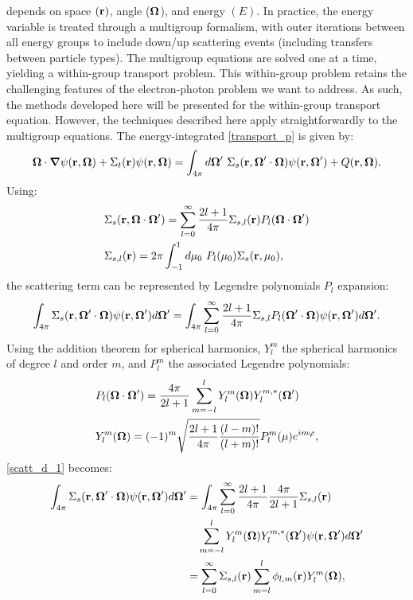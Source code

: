  depends on space $(\mathbf{r})$, angle ($\boldsymbol{\Omega}$), and 
energy $(E)$. In practice, the energy variable is treated through a
multigroup formalism, with outer iterations between all energy groups to
include down/up scattering events (including transfers between particle
types). The multigroup equations are solved one at a time, yielding a
within-group transport problem. This within-group problem retains the 
challenging features of the electron-photon problem we want to address. 
As such, the methods developed here will be presented for the within-group 
transport equation. However, the techniques described here apply 
straightforwardly to the multigroup equations. The energy-integrated 
\cref{transport_p} is given by:
\begin{equation}
\bo\cdot \bn \psi(\br,\bo) + \Sigma_t(\br)\psi(\br,\bo) =
\int_{4\pi}d\bo'\ \Sigma_s(\br,\bo'\cdot\bo)\psi(\br,\bo')+Q(\br,\bo).
\label{transport_p2}
\end{equation}
%
Using:
\begin{align}
  &\Sigma_s(\mathbf{r},\boldsymbol{\Omega}\cdot\boldsymbol{\Omega}') = \sum_{l=0}^{\infty} \frac{2l+1}{4\pi}
  \Sigma_{s,l}(\mathbf{r}) P_l(\boldsymbol{\Omega}\cdot\boldsymbol{\Omega}')\\
  &\Sigma_{s,l}(\mathbf{r}) = 2\pi \int_{-1}^1 d\mu_0\ P_l(\mu_0)
  \Sigma_s(\mathbf{r},\mu_0),
\end{align}
the scattering term can be represented by Legendre polynomials $P_l$ expansion:
\begin{equation}
  \int_{4\pi} \Sigma_s(\br,\bo'\cdot\bo) \psi(\br,\bo') d\bo' =
  \int_{4\pi} \sum_{l=0}^{\infty} \frac{2l+1}{4\pi} \Sigma_{s,l} P_l(\bo'\cdot\bo)
  \psi(\br,\bo') d\bo'.
  \label{scatt_d_1}
\end{equation}
Using the addition theorem for spherical harmonics, $Y_l^m$ the spherical
harmonics of degree $l$ and order $m$, and $P_l^m$ the associated Legendre
polynomials:
\begin{align}
  & P_l(\boldsymbol{\Omega}\cdot\boldsymbol{\Omega}') = \frac{4\pi}{2l+1} \sum_{m=-l}^l
  Y_l^m(\boldsymbol{\Omega})Y_l^{m,*}(\boldsymbol{\Omega}')\\
  & Y_l^m(\boldsymbol{\Omega}) = (-1)^m \sqrt{\frac{2l+1}{4\pi} \frac{(l-m)!}{(l+m)!}} P_l^m(\mu)
  e^{im\varphi},
\end{align}
\cref{scatt_d_1} becomes:
\begin{equation}
  \begin{split}
    \int_{4\pi} \Sigma_s(\mathbf{r},\boldsymbol{\Omega}'\cdot\boldsymbol{\Omega}) \psi(\mathbf{r},\boldsymbol{\Omega}') d\boldsymbol{\Omega}' &=
    \int_{4\pi} \sum_{l=0}^{\infty} \frac{2l+1}{4\pi}\frac{4\pi}{2l+1}
    \Sigma_{s,l}(\mathbf{r}) \\
    &\quad \sum_{m=-l}^{l} Y_l^m(\boldsymbol{\Omega})Y_l^{m,*}(\boldsymbol{\Omega}') \psi(\mathbf{r},\boldsymbol{\Omega}')d\boldsymbol{\Omega}'\\
    &= \sum_{l=0}^{\infty} \Sigma_{s,l}(\mathbf{r}) \sum_{m=l}^l \phi_{l,m}(\mathbf{r})
    Y_l^m(\boldsymbol{\Omega}),
  \end{split}
\end{equation}
